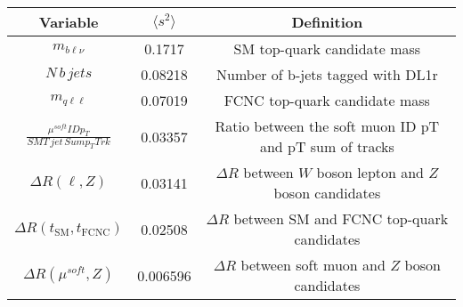 %
\begin{tabular}{ccc}
\toprule
Variable & $\langle s^{2}\rangle$  & Definition \\
\midrule
$m_{b\ell\nu}$  &  0.1717  &  SM top-quark candidate mass  \\
$N\,b\,jets$  &  0.08218  &  Number of b-jets tagged with DL1r  \\
$m_{q\ell\ell}$  &  0.07019  &  FCNC top-quark candidate mass  \\
$\frac{\mu^{soft} ID p_{T}}{SMT\,jet\,Sum p_{T} Trk}$  &  0.03357  &  Ratio between the soft muon ID pT and pT sum of tracks  \\
$\Delta R(\ell,Z)$  &  0.03141  &  $\Delta R$ between $W$ boson lepton and $Z$ boson candidates  \\
$\Delta R(t_{\text{SM}},t_{\text{FCNC}})$  &  0.02508  &  $\Delta R$ between SM and FCNC top-quark candidates  \\
$\Delta R(\mu^{soft},Z)$  &  0.006596  &  $\Delta R$ between soft muon and $Z$ boson candidates  \\
\bottomrule
\end{tabular}
%
